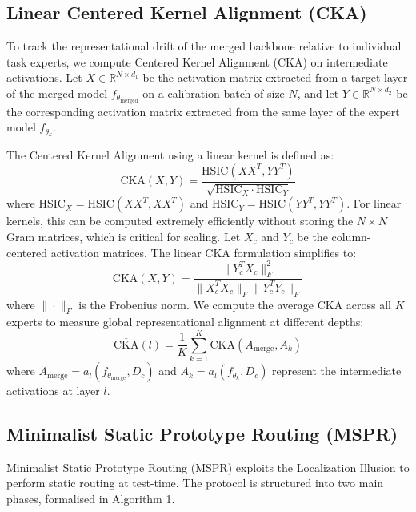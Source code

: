 \documentclass{article}
\theoremstyle{plain}
\theoremstyle{definition}
\theoremstyle{remark}
\begin{document}
\subsection{Linear Centered Kernel Alignment (CKA)}
To track the representational drift of the merged backbone relative to individual task experts, we compute Centered Kernel Alignment (CKA) on intermediate activations. Let $X \in \mathbb{R}^{N \times d_1}$ be the activation matrix extracted from a target layer of the merged model $f_{\theta_{\text{merged}}}$ on a calibration batch of size $N$, and let $Y \in \mathbb{R}^{N \times d_2}$ be the corresponding activation matrix extracted from the same layer of the expert model $f_{\theta_k}$.

The Centered Kernel Alignment using a linear kernel is defined as:
\begin{equation}
\text{CKA}(X, Y) = \frac{\text{HSIC}(XX^T, YY^T)}{\sqrt{\text{HSIC}_X \cdot \text{HSIC}_Y}}
\end{equation}
where $\text{HSIC}_X = \text{HSIC}(XX^T, XX^T)$ and $\text{HSIC}_Y = \text{HSIC}(YY^T, YY^T)$. For linear kernels, this can be computed extremely efficiently without storing the $N \times N$ Gram matrices, which is critical for scaling. Let $X_c$ and $Y_c$ be the column-centered activation matrices. The linear CKA formulation simplifies to:
\begin{equation}
\text{CKA}(X, Y) = \frac{\|Y_c^T X_c\|_F^2}{\|X_c^T X_c\|_F \|Y_c^T Y_c\|_F}
\end{equation}
where $\|\cdot\|_F$ is the Frobenius norm. We compute the average CKA across all $K$ experts to measure global representational alignment at different depths:
\begin{equation}
\overline{\text{CKA}}(l) = \frac{1}{K} \sum_{k=1}^K \text{CKA}(A_{\text{merge}}, A_k)
\end{equation}
where $A_{\text{merge}} = a_l(f_{\theta_{\text{merge}}}, D_c)$ and $A_k = a_l(f_{\theta_k}, D_c)$ represent the intermediate activations at layer $l$.

\subsection{Minimalist Static Prototype Routing (MSPR)}
Minimalist Static Prototype Routing (MSPR) exploits the Localization Illusion to perform static routing at test-time. The protocol is structured into two main phases, formalised in Algorithm 1.
\end{document}
